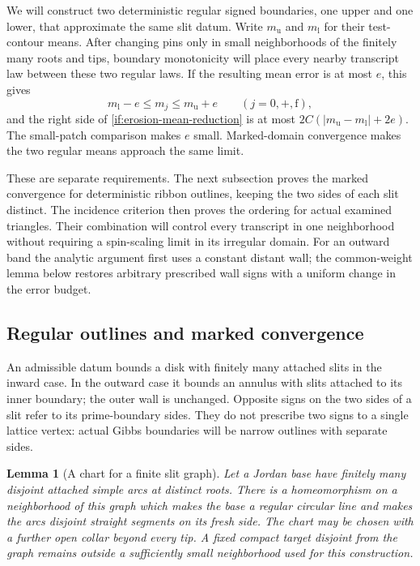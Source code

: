 \documentclass[11pt]{article}
\newtheorem{lemma}[theorem]{Lemma}
\theoremstyle{definition}
\theoremstyle{remark}
\numberwithin{equation}{section}
\begin{document}
We will construct two deterministic regular signed boundaries, one
upper and one lower, that approximate the same slit datum. Write
$m_{\mathrm u}$ and $m_{\mathrm l}$ for their test-contour means.
After changing pins only in small neighborhoods of the finitely many
roots and tips, boundary monotonicity will place every nearby
transcript law between these two regular laws. If the resulting
mean error is at most $e$, this gives
\[
       m_{\mathrm l}-e\le m_j\le m_{\mathrm u}+e
              \qquad(j=0,+,\mathrm f),
\]
and the right side of \eqref{if:erosion-mean-reduction} is at most
$2C(|m_{\mathrm u}-m_{\mathrm l}|+2e)$. The small-patch comparison
makes $e$ small. Marked-domain convergence makes the two regular
means approach the same limit.

These are separate requirements. The next subsection proves the
marked convergence for deterministic ribbon outlines, keeping the
two sides of each slit distinct. The incidence criterion then proves
the ordering for actual examined triangles. Their combination will
control every transcript in one neighborhood without requiring a
spin-scaling limit in its irregular domain. For an outward band the
analytic argument first uses a constant distant wall; the common-weight
lemma below restores arbitrary prescribed wall signs with a uniform
change in the error budget.

\subsection{Regular outlines and marked convergence}

An admissible datum bounds a disk with finitely many attached slits in
the inward case.  In the outward case it bounds an annulus with slits
attached to its inner boundary; the outer wall is unchanged.  Opposite
signs on the two sides of a slit refer to its prime-boundary sides.
They do not prescribe two signs to a single lattice vertex: actual
Gibbs boundaries will be narrow outlines with separate sides.

\begin{lemma}[A chart for a finite slit graph]\label{if:chart}
Let a Jordan base have finitely many disjoint attached simple arcs at
distinct roots.  There is a homeomorphism on a neighborhood of this
graph which makes the base a regular circular line and makes the arcs
disjoint straight segments on its fresh side.  The chart may be chosen
with a further open collar beyond every tip.  A fixed compact target
disjoint from the graph remains outside a sufficiently small
neighborhood used for this construction.
\end{lemma}
\end{document}
